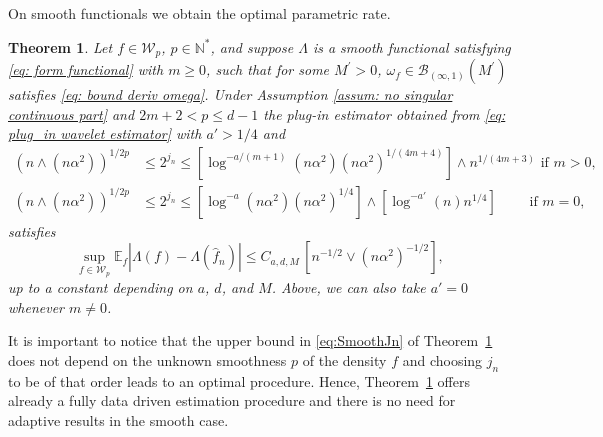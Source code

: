 \documentclass[preprint]{imsart}
\newtheorem{theorem}{Theorem}[section]
\numberwithin{equation}{section}
\begin{document}
On smooth functionals we obtain the optimal parametric rate.

\begin{theorem}\label{th: rate smooth}
    Let $f\in \mathcal{W}_{p}$, $p\in\mathbb{N}^*$, and suppose $\Lambda$ is a smooth functional satisfying \eqref{eq: form functional} with $m\geq0$, such that for some $M^\prime>0$, $\omega_f\in \mathcal{B}_{(\infty,1)}(M^\prime)$ satisfies \eqref{eq: bound deriv omega}. Under Assumption \ref{assum: no singular continuous part} and $2m+2< p\leq d-1$ the plug-in estimator obtained from \eqref{eq: plug_in wavelet estimator} with $a'>1/4$ and 
\begin{equation} \label{eq:SmoothJn}
\begin{split}
\left(n\wedge(n\alpha^2)\right)^{1/2p}&\leq 2^{j_n} \leq \left[\log^{-a/(m+1)}(n\alpha^2)(n\alpha^2)^{1/(4m+4)}\right]\wedge n^{1/(4m+3)}\text{ if }m>0, \\
\left(n\wedge(n\alpha^2)\right)^{1/2p}&\leq 2^{j_n} \leq \left[\log^{-a}(n\alpha^2)(n\alpha^2)^{1/4}\right]\wedge \left[\log^{-a'}(n)n^{1/4}\right]\qquad\text{ if }m=0,
\end{split}
\end{equation}
satisfies 
\[\underset{f\in\mathcal{W}_p}{\sup}\mathbb{E}_f|\Lambda(f)-\Lambda(\hat{f}_n)|\leq C_{a,d,M}\, \left[n^{-1/2}\vee(n\alpha^2)^{-1/2}\right],\]
up to a constant depending on $a$, $d$, and $M$. Above, we can also take $a'=0$ whenever $m\neq 0$.
\end{theorem}

It is important to notice that the upper bound in \eqref{eq:SmoothJn} of Theorem~\ref{th: rate smooth} does not depend on the unknown smoothness $p$ of the density $f$ and choosing $j_n$ to be of that order leads to an optimal procedure. Hence, Theorem~\ref{th: rate smooth} offers already a fully data driven estimation procedure and there is no need for adaptive results in the smooth case.
\end{document}
